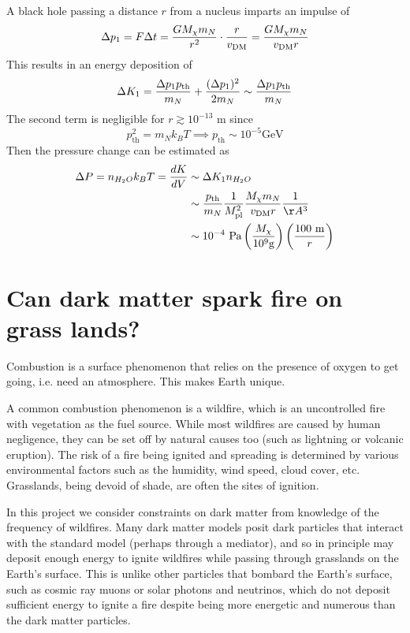 \documentclass[%
 reprint,
 amsmath,amssymb,
 aps,nofootinbib
]{revtex4-1}
\begin{document}
A black hole passing a distance $r$ from a nucleus imparts an impulse of $$\Delta p_1 = F \Delta t = \frac{G M_\chi m_N}{r^2} \cdot \frac{r}{v_{\rm DM}} = \frac{G M_\chi m_N}{v_{\rm DM} r}$$
This results in an energy deposition of $$\Delta K_1 = \frac{\Delta p_1 p_{\rm th}}{m_N} + \frac{(\Delta p_1)^2}{2 m_N} \sim \frac{\Delta p_1 p_{\rm th}}{m_N}$$
The second term is negligible for $r \gtrsim 10^{-13} \text{ m}$ since $$p_\text{th}^2 = m_N k_B T \implies p_\text{th} \sim 10^{-5} \text{GeV}$$
Then the pressure change can be estimated as
\begin{align*}
    \Delta P = n_{H_2O} k_B T = \frac{dK}{dV} &\sim \Delta K_1 n_{H_2O} \\
    &\sim \frac{p_\text{th}}{m_N} \frac{1}{M_\text{pl}^2} \frac{M_\chi m_N}{v_{\rm DM} r} \frac{1}{\AA^3} \\
    &\sim 10^{-4} \text{ Pa} \left( \frac{M_\chi}{10^9\text {g}} \right) \left( \frac{100 \text{ m}}{r} \right)
\end{align*}



\section{Can dark matter spark fire on grass lands?}
Combustion is a surface phenomenon that relies on the presence of oxygen to get going, i.e. need an atmosphere. This makes Earth unique.

A common combustion phenomenon is a wildfire, which is an uncontrolled fire with vegetation as the fuel source. While most wildfires are caused by human negligence, they can be set off by natural causes too (such as lightning or volcanic eruption). The risk of a fire being ignited and spreading is determined by various environmental factors such as the humidity, wind speed, cloud cover, etc. Grasslands, being devoid of shade, are often the sites of ignition. 

In this project we consider constraints on dark matter from knowledge of the frequency of wildfires. Many dark matter models posit dark particles that interact with the standard model (perhaps through a mediator), and so in principle may deposit enough energy to ignite wildfires while passing through grasslands on the Earth's surface. This is unlike other particles that bombard the Earth's surface, such as cosmic ray muons or solar photons and neutrinos, which do not deposit sufficient energy to ignite a fire despite being more energetic and numerous than the dark matter particles.
\end{document}
